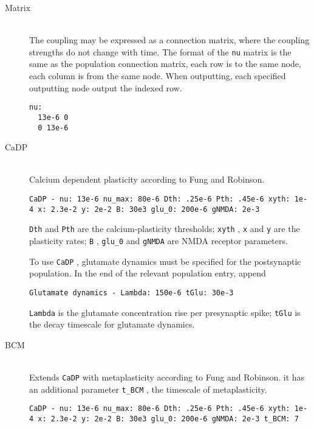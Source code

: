 \documentclass[12pt,a4paper]{article}
\newcommand{\type}[1]{{\small\small\tt #1} }
\begin{document}
\begin{itemize}
\begin{description}

    \item[Matrix]\ \\

    The coupling may be expressed as a connection matrix, where the coupling
    strengths do not change with time. The format of the \texttt{nu} matrix is
    the same as the population connection matrix, each row is to the same
    node, each column is from the same node. When outputting, each specified
    outputting node output the indexed row.

    \begin{lstlisting}
nu:
  13e-6 0
  0 13e-6
    \end{lstlisting}

    \item[CaDP]\ \\
    Calcium dependent plasticity according to Fung and Robinson.
    \begin{lstlisting}
CaDP - nu: 13e-6 nu_max: 80e-6 Dth: .25e-6 Pth: .45e-6 xyth: 1e-4 x: 2.3e-2 y: 2e-2 B: 30e3 glu_0: 200e-6 gNMDA: 2e-3
    \end{lstlisting}

    \type{Dth} and \type{Pth} are the calcium-plasticity thresholds; \type{xyth}, \type{x} and \type{y} are the plasticity rates; \type{B}, \type{glu\_0} and \type{gNMDA} are NMDA receptor parameters.

    To use \type{CaDP}, glutamate dynamics must be specified for the postsynaptic population. In the end of the relevant population entry, append
    \begin{lstlisting}
Glutamate dynamics - Lambda: 150e-6 tGlu: 30e-3
    \end{lstlisting}
    \type{Lambda} is the glutamate concentration rise per presynaptic spike; \type{tGlu} is the decay timescale for glutamate dynamics.

    \item[BCM]\ \\
    Extends \type{CaDP} with metaplasticity according to Fung and Robinson. it has an additional parameter \type{t\_BCM}, the timescale of metaplasticity.
    \begin{lstlisting}
CaDP - nu: 13e-6 nu_max: 80e-6 Dth: .25e-6 Pth: .45e-6 xyth: 1e-4 x: 2.3e-2 y: 2e-2 B: 30e3 glu_0: 200e-6 gNMDA: 2e-3 t_BCM: 7
    \end{lstlisting}


\end{description}
\end{itemize}
\end{document}

